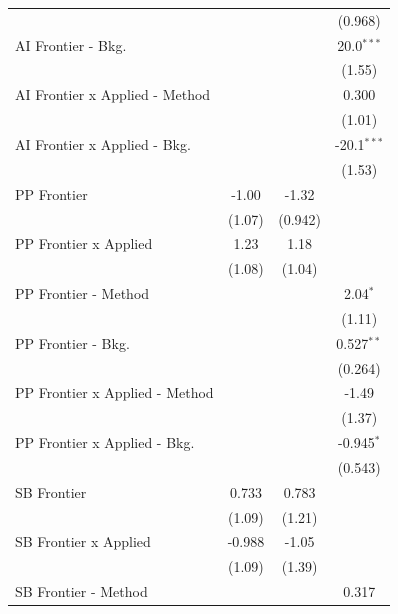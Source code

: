 \begin{tabular}{lccc}
                                  &             &         & (0.968)\\   
   AI Frontier - Bkg.             &             &         & 20.0$^{***}$\\   
                                  &             &         & (1.55)\\   
   AI Frontier x Applied - Method &             &         & 0.300\\   
                                  &             &         & (1.01)\\   
   AI Frontier x Applied - Bkg.   &             &         & -20.1$^{***}$\\   
                                  &             &         & (1.53)\\   
   PP Frontier                    & -1.00       & -1.32   &   \\   
                                  & (1.07)      & (0.942) &   \\   
   PP Frontier x Applied          & 1.23        & 1.18    &   \\   
                                  & (1.08)      & (1.04)  &   \\   
   PP Frontier - Method           &             &         & 2.04$^{*}$\\   
                                  &             &         & (1.11)\\   
   PP Frontier - Bkg.             &             &         & 0.527$^{**}$\\   
                                  &             &         & (0.264)\\   
   PP Frontier x Applied - Method &             &         & -1.49\\   
                                  &             &         & (1.37)\\   
   PP Frontier x Applied - Bkg.   &             &         & -0.945$^{*}$\\   
                                  &             &         & (0.543)\\   
   SB Frontier                    & 0.733       & 0.783   &   \\   
                                  & (1.09)      & (1.21)  &   \\   
   SB Frontier x Applied          & -0.988      & -1.05   &   \\   
                                  & (1.09)      & (1.39)  &   \\   
   SB Frontier - Method           &             &         & 0.317\\   

\end{tabular}
